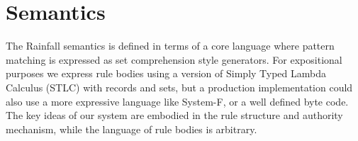 

\section{Semantics}
The Rainfall semantics is defined in terms of a core language where pattern matching is expressed as set comprehension style generators. For expositional purposes we express rule bodies using a version of Simply Typed Lambda Calculus (STLC) with records and sets, but a production implementation could also use a more expressive language like System-F, or a well defined byte code. The key ideas of our system are embodied in the rule structure and authority mechanism, while the language of rule bodies is arbitrary.


